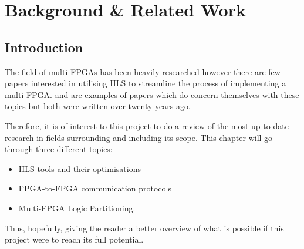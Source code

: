\chapter{Background \& Related Work}
\label{chap:Background}

\section{Introduction}
The field of multi-FPGAs has been heavily researched however there are few papers interested in utilising HLS to streamline the process of implementing a multi-FPGA. \cite{564741} and \cite{707888} are examples of papers which do concern themselves with these topics but both were written over twenty years ago.

Therefore, it is of interest to this project to do a review of the most up to date research in fields surrounding and including its scope. This chapter will go through three different topics:

\begin{itemize}
    \item HLS tools and their optimisations
    \item FPGA-to-FPGA communication protocols
    \item Multi-FPGA Logic Partitioning.
\end{itemize}

Thus, hopefully, giving the reader a better overview of what is possible if this project were to reach its full potential.
